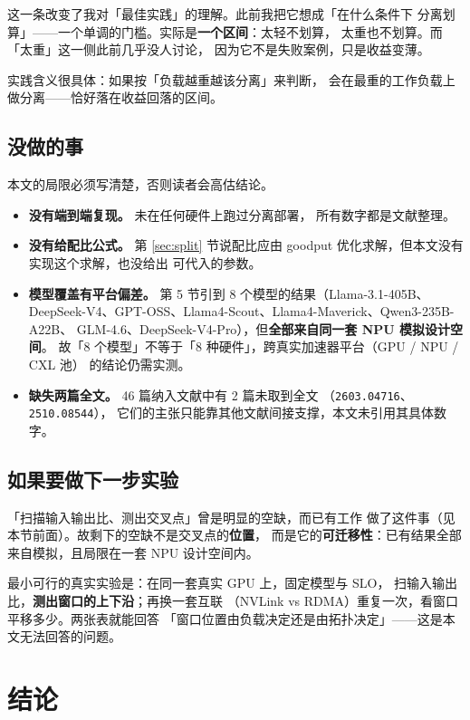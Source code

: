 这一条改变了我对「最佳实践」的理解。此前我把它想成「在什么条件下
分离划算」——一个单调的门槛。实际是\textbf{一个区间}：太轻不划算，
太重也不划算。而「太重」这一侧此前几乎没人讨论，
因为它不是失败案例，只是收益变薄。

实践含义很具体：如果按「负载越重越该分离」来判断，
会在最重的工作负载上做分离——恰好落在收益回落的区间。

\subsection{没做的事}

本文的局限必须写清楚，否则读者会高估结论。

\begin{itemize}[leftmargin=1.3em,itemsep=1.5pt,topsep=2pt]
  \item \textbf{没有端到端复现。} 未在任何硬件上跑过分离部署，
        所有数字都是文献整理。
  \item \textbf{没有给配比公式。} 第 \ref{sec:split} 节说配比应由
        goodput 优化求解，但本文没有实现这个求解，也没给出
        可代入的参数。
  \item \textbf{模型覆盖有平台偏差。} 第 5 节引到 8 个模型的结果（Llama-3.1-405B、
        DeepSeek-V4、GPT-OSS、Llama4-Scout、Llama4-Maverick、Qwen3-235B-A22B、
        GLM-4.6、DeepSeek-V4-Pro），但\textbf{全部来自同一套 NPU 模拟设计空间}。
        故「8 个模型」不等于「8 种硬件」，跨真实加速器平台（GPU / NPU / CXL 池）
        的结论仍需实测。
  \item \textbf{缺失两篇全文。} 46 篇纳入文献中有 2 篇未取到全文
        （\texttt{2603.04716}、\texttt{2510.08544}），
        它们的主张只能靠其他文献间接支撑，本文未引用其具体数字。
\end{itemize}

\subsection{如果要做下一步实验}

「扫描输入输出比、测出交叉点」曾是明显的空缺，而已有工作
做了这件事（见本节前面）。故剩下的空缺不是交叉点的\textbf{位置}，
而是它的\textbf{可迁移性}：已有结果全部来自模拟，且局限在一套
NPU 设计空间内。

最小可行的真实实验是：在同一套真实 GPU 上，固定模型与 SLO，
扫输入输出比，\textbf{测出窗口的上下沿}；再换一套互联
（NVLink vs RDMA）重复一次，看窗口平移多少。两张表就能回答
「窗口位置由负载决定还是由拓扑决定」——这是本文无法回答的问题。


\section{结论}

